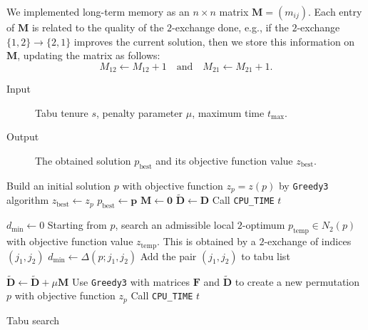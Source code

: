   We implemented long-term memory as an $n \times n$ matrix $\bm M =(m_{ij})$. Each entry of $\bm M$ is related to the quality of the $2$-exchange done, e.g., if the $2$-exchange $\{1,2\} \to \{2,1\}$  improves the current solution, then we store this information on $\bm M$, updating the matrix as follows:
  \[M_{12} \gets M_{12}+1 \quad  \text{and} \quad  M_{21}\gets M_{21}+1.\]
  
   



\begin{description}
	\item[Input] Tabu tenure $s$, penalty parameter $\mu$, maximum time $t_\mathrm{max}$.
	\item[Output] The obtained solution $p_\mathrm{best}$ and its objective function value $z_\mathrm{best}$.
\end{description}


\begin{algorithm}
	\footnotesize	
	Build an initial solution $p$ with objective function  $z_p=z(p)$ by \texttt{Greedy3} algorithm\;
	$z_\mathrm{best} \gets z_p$\;
	$ p_\mathrm{best} \gets \bm p$\;
	$\bm M \gets \bm 0$\;
	$\tilde{\bm D} \gets \bm D$\;
	Call \texttt{CPU\_TIME}  $t$\;
	{\label{alglinea:dmin}
			$d_\text{min} \gets 0$\;
			Starting from $p$, search an admissible local $2$-optimum $p_\mathrm{temp}\in {N}_2(p)$ with objective function value $z_\mathrm{temp}$. This is obtained by a $2$-exchange of indices $(j_1,j_2)$\;
			$d_\mathrm{min} \gets \Delta(p;j_1,j_2)$\;
			Add the pair $(j_1,j_2)$ to tabu list\;
			
			
			$\tilde{\bm D} \gets  \tilde{\bm D} + \mu \bm M $ \;
			Use \texttt{Greedy3} with matrices $\bm F$ and $\tilde{\bm D}$ to create a new permutation $p$ with objective function $z_p$\;
			Call \texttt{CPU\_TIME} $t$\;
		}
		\caption{Tabu search}
		\label{Pseudocode: Tabu Search}
	\end{algorithm}


